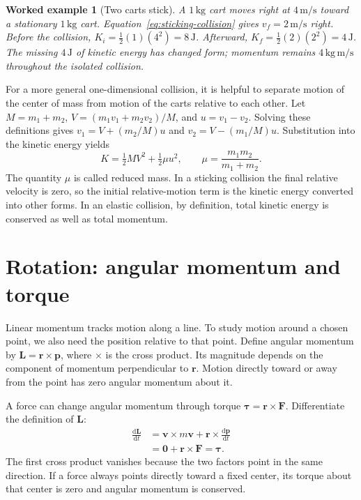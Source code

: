 \documentclass[11pt,oneside]{book}
\newcommand{\dd}{\mathrm{d}}
\newcommand{\vect}[1]{\boldsymbol{#1}}
\newcommand{\od}[2]{\frac{\dd #1}{\dd #2}}
\theoremstyle{reviewstyle}
\newtheorem{example}{Worked example}[chapter]
\begin{document}
\begin{example}[Two carts stick]
A $1\,\mathrm{kg}$ cart moves right at $4\,\mathrm{m/s}$ toward a stationary $1\,\mathrm{kg}$ cart. Equation~\eqref{eq:sticking-collision} gives $v_f=2\,\mathrm{m/s}$ right. Before the collision, $K_i=\tfrac12(1)(4^2)=8\,\mathrm J$. Afterward, $K_f=\tfrac12(2)(2^2)=4\,\mathrm J$. The missing $4\,\mathrm J$ of kinetic energy has changed form; momentum remains $4\,\mathrm{kg\,m/s}$ throughout the isolated collision.
\end{example}

For a more general one-dimensional collision, it is helpful to separate motion of the center of mass from motion of the carts relative to each other. Let $M=m_1+m_2$, $V=(m_1v_1+m_2v_2)/M$, and $u=v_1-v_2$. Solving these definitions gives $v_1=V+(m_2/M)u$ and $v_2=V-(m_1/M)u$. Substitution into the kinetic energy yields
\begin{equation}
K=\tfrac12MV^2+\tfrac12\mu u^2,
\qquad \mu=\frac{m_1m_2}{m_1+m_2}.
\end{equation}
The quantity $\mu$ is called reduced mass. In a sticking collision the final relative velocity is zero, so the initial relative-motion term is the kinetic energy converted into other forms. In an elastic collision, by definition, total kinetic energy is conserved as well as total momentum.

\section{Rotation: angular momentum and torque}
Linear momentum tracks motion along a line. To study motion around a chosen point, we also need the position relative to that point. Define angular momentum by $\vect L=\vect r\times\vect p$, where $\times$ is the cross product. Its magnitude depends on the component of momentum perpendicular to $\vect r$. Motion directly toward or away from the point has zero angular momentum about it.

A force can change angular momentum through torque $\vect\tau=\vect r\times\vect F$. Differentiate the definition of $\vect L$:
\begin{align}
\od{\vect L}{t}
&=\vect v\times m\vect v+\vect r\times\od{\vect p}{t}\\
&=\vect 0+\vect r\times\vect F=\vect\tau.
\end{align}
The first cross product vanishes because the two factors point in the same direction. If a force always points directly toward a fixed center, its torque about that center is zero and angular momentum is conserved.
\end{document}
